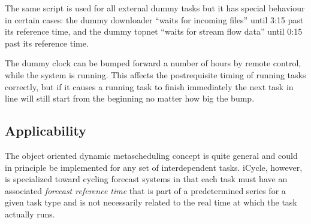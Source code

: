 \documentclass[11pt,a4paper]{article}
\begin{document}
The same script is used for all external dummy tasks but it has special
behaviour in certain cases: the dummy downloader ``waits for incoming
files'' until 3:15 past its reference time, and the dummy topnet ``waits
for stream flow data'' until 0:15 past its reference time.

The dummy clock can be bumped forward a number of hours by remote
control, while the system is running. This affects the postrequisite
timing of running tasks correctly, but if it causes a running task to
finish immediately the next task in line will still start from the
beginning no matter how big the bump.







\subsection{Applicability}

The object oriented dynamic metascheduling concept is quite general and
could in principle be implemented for any set of interdependent tasks.
iCycle, however, is specialized toward cycling forecast systems in that
each task must have an associated {\em forecast reference time} that is
part of a predetermined series for a given task type and is not
necessarily related to the real time at which the task actually runs.  
\end{document}

